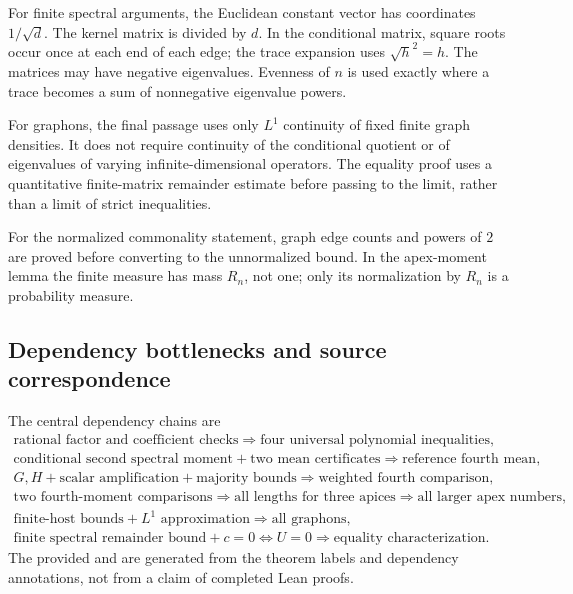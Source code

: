 For finite spectral arguments, the Euclidean constant vector has coordinates $1/\sqrt d$.
The kernel matrix is divided by $d$.  In the conditional matrix, square roots occur once at
each end of each edge; the trace expansion uses $\sqrt{h}^2=h$.  The matrices may have
negative eigenvalues.  Evenness of $n$ is used exactly where a trace becomes a sum of
nonnegative eigenvalue powers.

For graphons, the final passage uses only $L^1$ continuity of fixed finite graph densities.
It does not require continuity of the conditional quotient or of eigenvalues of varying
infinite-dimensional operators.  The equality proof uses a quantitative finite-matrix
remainder estimate before passing to the limit, rather than a limit of strict inequalities.

For the normalized commonality statement, graph edge counts and powers of $2$ are proved
before converting to the unnormalized bound.  In the apex-moment lemma the finite measure
has mass $R_n$, not one; only its normalization by $R_n$ is a probability measure.

\subsection{Dependency bottlenecks and source correspondence}
The central dependency chains are
\[
 \begin{gathered}
 \text{rational factor and coefficient checks}
 \Longrightarrow \text{four universal polynomial inequalities},\\
 \text{conditional second spectral moment}
 +\text{two mean certificates}
 \Longrightarrow \text{reference fourth mean},\\
 G,H+\text{scalar amplification}+\text{majority bounds}
 \Longrightarrow \text{weighted fourth comparison},\\
 \text{two fourth-moment comparisons}
 \Longrightarrow \text{all lengths for three apices}
 \Longrightarrow \text{all larger apex numbers},\\
 \text{finite-host bounds}+L^1\text{ approximation}
 \Longrightarrow \text{all graphons},\\
 \text{finite spectral remainder bound}+c=0\Longleftrightarrow U=0
 \Longrightarrow \text{equality characterization}.
 \end{gathered}
\]
The provided  and  are generated
from the theorem labels and dependency annotations, not from a claim of completed Lean
proofs.

